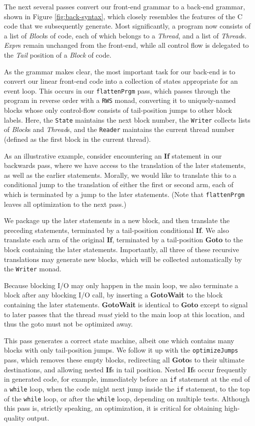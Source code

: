 \documentclass[preprint,10pt]{sigplanconf}
\renewcommand{\t}{\texttt}
\renewcommand{\b}{\textbf}
\renewcommand{\i}{\textit}
\begin{document}
The next several passes convert our front-end grammar to a back-end grammar,
shown in Figure \ref{fig:back-syntax}, which closely resembles the features of
the C code that we subsequently generate. Most significantly, a program now
consists of a list of \i{Block}s of code, each of which belongs to a \i{Thread},
and a list of \i{Thread}s. \i{Expr}s remain unchanged from the front-end, while
all control flow is delegated to the \i{Tail} position of a \i{Block} of code. 

As the grammar makes clear, the most important task for our back-end is to
convert our linear front-end code into a collection of states appropriate for an
event loop. This occurs in our \t{flattenPrgm} pass, which passes through the
program in reverse order with a \t{RWS} monad, converting it to uniquely-named
blocks whose only control-flow consists of tail-position jumps to other block
labels. Here, the \t{State} maintains the next block number, the \t{Writer}
collects lists of \i{Block}s and \i{Thread}s, and the \t{Reader} maintains the
current thread number (defined as the first block in the current thread).

As an illustrative example, consider encountering an \b{If} statement in our
backwards pass, where we have access to the translation of the later statements,
as well as the earlier statements. Morally, we would like to translate this to a
conditional jump to the translation of either the first or second arm, each of
which is terminated by a jump to the later statements. (Note that
\t{flattenPrgm} leaves all optimization to the next pass.)

We package up the later statements in a new block, and then translate the
preceding statements, terminated by a tail-position conditional \b{If}. We also
translate each arm of the original \b{If}, terminated by a tail-position
\b{Goto} to the block containing the later statements. Importantly, all three of
these recursive translations may generate new blocks, which will be collected
automatically by the \t{Writer} monad.

Because blocking I/O may only happen in the main loop, we also terminate a block
after any blocking I/O call, by inserting a \b{GotoWait} to the block containing
the later statements. \b{GotoWait} is identical to \b{Goto} except to signal to
later passes that the thread \emph{must} yield to the main loop at this
location, and thus the goto must not be optimized away.

This pass generates a correct state machine, albeit one which contains many
blocks with only tail-position jumps. We follow it up with the \t{optimizeJumps}
pass, which removes these empty blocks, redirecting all \b{Goto}s to their
ultimate destinations, and allowing nested \b{If}s in tail position. Nested
\b{If}s occur frequently in generated code, for example, immediately before an
\t{if} statement at the end of a \t{while} loop, when the code might next jump
inside the \t{if} statement, to the top of the \t{while} loop, or after the
\t{while} loop, depending on multiple tests. Although this pass is, strictly
speaking, an optimization, it is critical for obtaining high-quality output.
\end{document}
